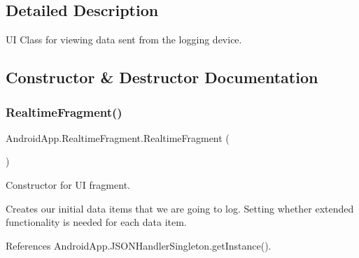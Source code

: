 \subsection{Detailed Description}
UI Class for viewing data sent from the logging device. 

\subsection{Constructor \& Destructor Documentation}
\mbox{\label{class_android_app_1_1_realtime_fragment_a834ef524bedd8948892a6915945c071c}} 
\subsubsection{\texorpdfstring{Realtime\+Fragment()}{RealtimeFragment()}}
{\footnotesize\ttfamily Android\+App.\+Realtime\+Fragment.\+Realtime\+Fragment (\begin{DoxyParamCaption}{ }\end{DoxyParamCaption})\hspace{0.3cm}{\ttfamily [inline]}}



Constructor for UI fragment. 

Creates our initial data items that we are going to log. Setting whether extended functionality is needed for each data item. 

References Android\+App.\+J\+S\+O\+N\+Handler\+Singleton.\+get\+Instance().


